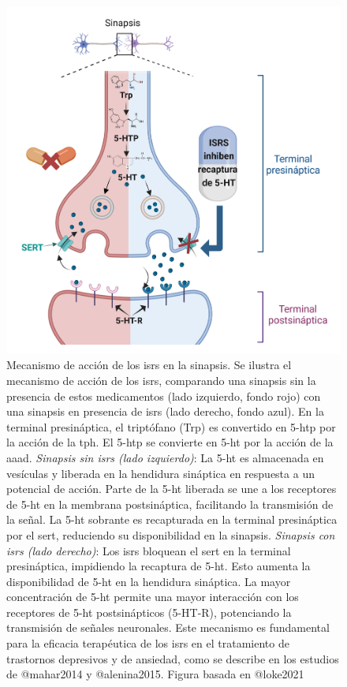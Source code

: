 \documentclass[
  11pt]{../MastersDoctoralThesisUNAM}
\begin{document}
\begin{tcolorbox}[enhanced jigsaw, colframe=quarto-callout-warning-color-frame, left=2mm, bottomrule=.15mm, rightrule=.15mm, arc=.35mm, toprule=.15mm, leftrule=.75mm, breakable, opacityback=0, colback=white]
\begin{figure}[H]
{\includegraphics[width=0.9\linewidth,height=\textheight,keepaspectratio]{../Figures/ssri.png}

}

\caption[Mecanismo de acción de los fármacos antidepresivos
clásicos]{\label{fig-ssri}Mecanismo de acción de los \ac{isrs} en la
sinapsis. Se ilustra el mecanismo de acción de los \ac{isrs}, comparando
una sinapsis sin la presencia de estos medicamentos (lado izquierdo,
fondo rojo) con una sinapsis en presencia de \ac{isrs} (lado derecho,
fondo azul). En la terminal presináptica, el triptófano (Trp) es
convertido en \ac{5-htp} por la acción de la \ac{tph}. El \ac{5-htp} se
convierte en \ac{5-ht} por la acción de la \ac{aaad}. \emph{Sinapsis sin
\ac{isrs} (lado izquierdo)}: La \ac{5-ht} es almacenada en vesículas y
liberada en la hendidura sináptica en respuesta a un potencial de
acción. Parte de la \ac{5-ht} liberada se une a los receptores de
\ac{5-ht} en la membrana postsináptica, facilitando la transmisión de la
señal. La \ac{5-ht} sobrante es recapturada en la terminal presináptica
por el \ac{sert}, reduciendo su disponibilidad en la sinapsis.
\emph{Sinapsis con \ac{isrs} (lado derecho)}: Los \ac{isrs} bloquean el
\ac{sert} en la terminal presináptica, impidiendo la recaptura de
\ac{5-ht}. Esto aumenta la disponibilidad de \ac{5-ht} en la hendidura
sináptica. La mayor concentración de \ac{5-ht} permite una mayor
interacción con los receptores de \ac{5-ht} postsinápticos (5-HT-R),
potenciando la transmisión de señales neuronales. Este mecanismo es
fundamental para la eficacia terapéutica de los \ac{isrs} en el
tratamiento de trastornos depresivos y de ansiedad, como se describe en
los estudios de @mahar2014 y @alenina2015. Figura basada en @loke2021}

\end{figure}%

\end{tcolorbox}
\end{document}
